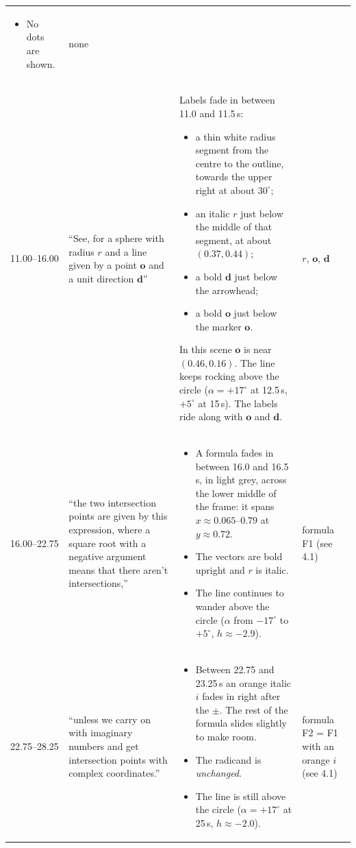 \documentclass[10pt,a4paper]{article}
\newcommand{\vo}{\mathbf{o}}\newcommand{\vd}{\mathbf{d}}\newcommand{\vp}{\mathbf{p}}
\begin{document}
\begin{longtable}{@{}p{14mm}p{38mm}p{80mm}p{28mm}@{}}
\begin{itemize}
\item No dots are shown.
\end{itemize} & none\\
11.00--16.00 & ``See, for a sphere with radius $r$ and a line given by a point $\vo$ and a unit direction $\vd$'' &
Labels fade in between 11.0 and 11.5\,s:
\begin{itemize}
\item a thin white radius segment from the centre to the outline, towards the upper right at about $30^\circ$;
\item an italic $r$ just below the middle of that segment, at about $(0.37,0.44)$;
\item a bold $\vd$ just below the arrowhead;
\item a bold $\vo$ just below the marker $\vo$.
\end{itemize}
In this scene $\vo$ is near $(0.46,0.16)$. The line keeps rocking above the circle ($\alpha=+17^\circ$ at 12.5\,s, $+5^\circ$ at 15\,s). The labels ride along with $\vo$ and $\vd$. &
$r$, $\mathbf{o}$, $\mathbf{d}$\\
16.00--22.75 & ``the two intersection points are given by this expression, where a square root with a negative argument means that there aren't intersections,'' &
\begin{itemize}
\item A formula fades in between 16.0 and 16.5\,s, in light grey, across the lower middle of the frame: it spans $x\approx0.065$--$0.79$ at $y\approx0.72$.
\item The vectors are bold upright and $r$ is italic.
\item The line continues to wander above the circle ($\alpha$ from $-17^\circ$ to $+5^\circ$, $h\approx-2.9$).
\end{itemize} &
formula F1 (see 4.1)\\
22.75--28.25 & ``unless we carry on with imaginary numbers and get intersection points with complex coordinates.'' &
\begin{itemize}
\item Between 22.75 and 23.25\,s an \textcolor{orange!90!black}{orange italic $i$} fades in right after the $\pm$. The rest of the formula slides slightly to make room.
\item The radicand is \emph{unchanged}.
\item The line is still above the circle ($\alpha=+17^\circ$ at 25\,s, $h\approx-2.0$).
\end{itemize} &
formula F2 = F1 with an orange $i$ (see 4.1)\\

\end{longtable}
\end{document}
